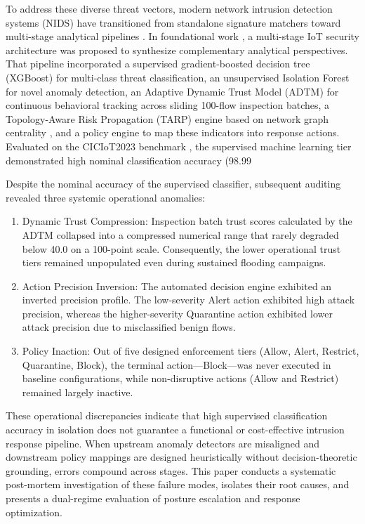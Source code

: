 \documentclass[journal,10pt,onecolumn]{IEEEtran}
\begin{document}
To address these diverse threat vectors, modern network intrusion detection systems (NIDS) have transitioned from standalone signature matchers toward multi-stage analytical pipelines \cite{21, 22}. In foundational work \cite{1}, a multi-stage IoT security architecture was proposed to synthesize complementary analytical perspectives. That pipeline incorporated a supervised gradient-boosted decision tree (XGBoost) \cite{8} for multi-class threat classification, an unsupervised Isolation Forest \cite{15} for novel anomaly detection, an Adaptive Dynamic Trust Model (ADTM) for continuous behavioral tracking across sliding 100-flow inspection batches, a Topology-Aware Risk Propagation (TARP) engine based on network graph centrality \cite{12}, and a policy engine to map these indicators into response actions. Evaluated on the CICIoT2023 benchmark \cite{3}, the supervised machine learning tier demonstrated high nominal classification accuracy (98.99%

Despite the nominal accuracy of the supervised classifier, subsequent auditing revealed three systemic operational anomalies:
\begin{enumerate}
  \item Dynamic Trust Compression: Inspection batch trust scores calculated by the ADTM collapsed into a compressed numerical range that rarely degraded below 40.0 on a 100-point scale. Consequently, the lower operational trust tiers remained unpopulated even during sustained flooding campaigns.
  \item Action Precision Inversion: The automated decision engine exhibited an inverted precision profile. The low-severity Alert action exhibited high attack precision, whereas the higher-severity Quarantine action exhibited lower attack precision due to misclassified benign flows.
  \item Policy Inaction: Out of five designed enforcement tiers (Allow, Alert, Restrict, Quarantine, Block), the terminal action—Block—was never executed in baseline configurations, while non-disruptive actions (Allow and Restrict) remained largely inactive.
\end{enumerate}

These operational discrepancies indicate that high supervised classification accuracy in isolation does not guarantee a functional or cost-effective intrusion response pipeline. When upstream anomaly detectors are misaligned and downstream policy mappings are designed heuristically without decision-theoretic grounding, errors compound across stages. This paper conducts a systematic post-mortem investigation of these failure modes, isolates their root causes, and presents a dual-regime evaluation of posture escalation and response optimization.
\end{document}
